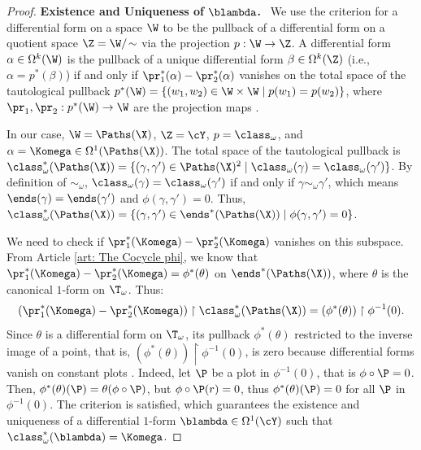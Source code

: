   \begin{proof}
    \textbf{Existence and Uniqueness of $\blambda$.}~
    We use the criterion for a differential form on a space $\W$ to be the pullback of a differential form on a quotient space $\Z = \W/\!\sim$ via the projection $p : \W \to \Z$.
    A differential form $\alpha \in \Omega^k(\W)$ is the pullback of a unique differential form $\beta \in \Omega^k(\Z)$ (i.e., $\alpha = p^*(\beta)$) if and only if $\pr_1^*(\alpha) - \pr_2^*(\alpha)$ vanishes on the total space of the tautological pullback $p^*(\W) = \{ (w_1, w_2) \in \W \times \W \mid p(w_1) = p(w_2) \}$,
    where $\pr_1, \pr_2 : p^*(\W) \to \W$ are the projection maps \cite[ (Note 2)]{PIZ13}.
    
    In our case,
    $\W = \Paths(\X)$, $\Z = \cY$,
    $p = \class_\omega$,
    and $\alpha = \Komega \in \Omega^1(\Paths(\X))$.
    The total space of the tautological pullback is $\class_\omega^*(\Paths(\X)) = \{ (\gamma, \gamma') \in \Paths(\X)^2 \mid \class_\omega(\gamma) = \class_\omega(\gamma') \}$.
    By definition of $\sim_\omega$, $\class_\omega(\gamma) = \class_\omega(\gamma')$ if and only if $\gamma \sim_\omega \gamma'$,
    which means $\ends(\gamma) = \ends(\gamma')$ and $\phi(\gamma,\gamma') = 0$.
    Thus,
    $\class_\omega^*(\Paths(\X)) = \{ (\gamma, \gamma') \in \ends^*(\Paths(\X)) \mid \phi(\gamma,\gamma') = 0 \}$.
    
    We need to check if $\pr_1^*(\Komega) - \pr_2^*(\Komega)$ vanishes on this subspace.
    From Article \ref{art: The Cocycle phi},
    we know that $\pr_1^*(\Komega) - \pr_2^*(\Komega) = \phi^*(\theta)$ on $\ends^*(\Paths(\X))$,
    where $\theta$ is the canonical $1$-form on $\T_\omega$.
    Thus:
    $$
      (\pr_1^*(\Komega) - \pr_2^*(\Komega)) \restriction \class_\omega^*(\Paths(\X)) = (\phi^*(\theta)) \restriction \phi^{-1}(0).
      $$
    Since $\theta$ is a differential form on $\T_\omega$,
    its pullback $\phi^*(\theta)$ restricted to the inverse image of a point,
    that is,
    $(\phi^*(\theta)) \restriction \phi^{-1}(0)$,
    is zero because differential forms vanish on constant plots \cite[Ex. 96]{PIZ13}.
    Indeed,
    let $\P$ be a plot in $\phi^{-1}(0)$,
    that is $\phi \circ \P = 0$.
    Then,
    $\phi^*(\theta)(\P) = \theta(\phi \circ \P)$,
    but $\phi \circ \P(r) = 0$,
    thus $\phi^*(\theta)(\P) = 0$ for all $\P$ in $\phi^{-1}(0)$.
    The criterion is satisfied,
    which guarantees the existence and uniqueness of a differential $1$-form $\blambda \in \Omega^1(\cY)$ such that $\class_\omega^*(\blambda) = \Komega$.
    

\end{proof}
